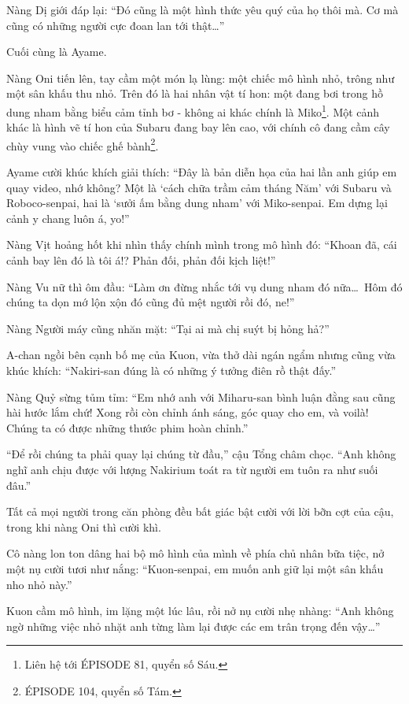 \documentclass[../main.tex]{subfiles}
\begin{document}
Nàng Dị giới đáp lại: ``Đó cũng là một hình thức yêu quý của họ thôi mà. Cơ mà cũng có những người cực đoan lan tới thật\dots''

Cuối cùng là Ayame.

Nàng Oni tiến lên, tay cầm một món lạ lùng: một chiếc mô hình nhỏ, trông như một sân khấu thu nhỏ. Trên đó là hai nhân vật tí hon: một đang bơi trong hồ dung nham bằng biểu cảm tỉnh bơ - không ai khác chính là Miko\footnote{Liên hệ tới {\flaregothic ÉPISODE 81}, quyển số Sáu.}. Một cảnh khác là hình vẽ tí hon của Subaru đang bay lên cao, với chính cô đang cầm cây chùy vung vào chiếc ghế bành\footnote{{\flaregothic ÉPISODE 104}, quyển số Tám.}.

Ayame cười khúc khích giải thích: ``Đây là bản diễn họa của hai lần anh giúp em quay video, nhớ không? Một là `cách chữa trầm cảm tháng Năm' với Subaru và Roboco-senpai, hai là `sưởi ấm bằng dung nham' với Miko-senpai. Em dựng lại cảnh y chang luôn á, yo!''

Nàng Vịt hoảng hốt khi nhìn thấy chính mình trong mô hình đó: ``Khoan đã, cái cảnh bay lên đó là tôi á!? Phản đối, phản đối kịch liệt!''

Nàng Vu nữ thì ôm đầu: ``Làm ơn đừng nhắc tới vụ dung nham đó nữa\dots\ Hôm đó chúng ta dọn mớ lộn xộn đó cũng đủ mệt người rồi đó, ne!''

Nàng Người máy cũng nhăn mặt: ``Tại ai mà chị suýt bị hỏng hả?''

A-chan ngồi bên cạnh bố mẹ của Kuon, vừa thở dài ngán ngẩm nhưng cũng vừa khúc khích: ``Nakiri-san đúng là có những ý tưởng điên rồ thật đấy.''

Nàng Quỷ sừng tủm tỉm: ``Em nhớ anh với Miharu-san bình luận đằng sau cũng hài hước lắm chứ! Xong rồi còn chỉnh ánh sáng, góc quay cho em, và voilà! Chúng ta có được những thước phim hoàn chỉnh.''

``Để rồi chúng ta phải quay lại chúng từ đầu,'' cậu Tổng châm chọc. ``Anh không nghĩ anh chịu được với lượng Nakirium toát ra từ người em tuôn ra như suối đâu.''

Tất cả mọi người trong căn phòng đều bất giác bật cười với lời bỡn cợt của cậu, trong khi nàng Oni thì cười khì.

Cô nàng lon ton dâng hai bộ mô hình của mình về phía chủ nhân bữa tiệc, nở một nụ cười tươi như nắng: ``Kuon-senpai, em muốn anh giữ lại một sân khấu nho nhỏ này.''

Kuon cầm mô hình, im lặng một lúc lâu, rồi nở nụ cười nhẹ nhàng: ``Anh không ngờ những việc nhỏ nhặt anh từng làm lại được các em trân trọng đến vậy\dots''
\end{document}

